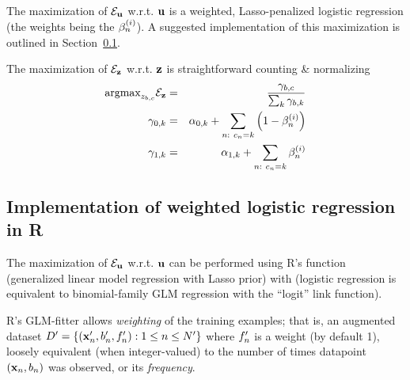 \documentclass{article}
\begin{document}
The maximization of ${\cal E}_{{\bf u}}$ w.r.t. ${\bf u}$ is a weighted, Lasso-penalized logistic regression
(the weights being the $\beta^{(i )}_{n}$).
A suggested implementation of this maximization is outlined in Section~\ref{sec:WeightedLogisticRegression}.

The maximization of ${\cal E}_{{\bf z}}$ w.r.t. ${\bf z}$ is straightforward counting \& normalizing
\begin{eqnarray*}
  \argmax_{\labelerrprob_{\binlabel,\catlabel}} \emobjective_{\labelerrprobs} & = & \frac{\labelerrsum_{\binlabel,\catlabel}}{\sum_{\catlabelindex} \labelerrsum_{\binlabel,\catlabelindex} } \\
  \labelerrsum_{0,\catlabelindex} & = & \pseudocount_{0,\catlabelindex} + \sum_{\datapoint:\ \catlabel_{\datapoint} = \catlabelindex} \left( 1 - \postprob \right) \\
  \labelerrsum_{1,\catlabelindex} & = & \pseudocount_{1,\catlabelindex} + \sum_{\datapoint:\ \catlabel_{\datapoint} = \catlabelindex} \postprob
\end{eqnarray*}

\subsection{Implementation of weighted logistic regression in R}
\label{sec:WeightedLogisticRegression}

The maximization of ${\cal E}_{{\bf u}}$ w.r.t. ${\bf u}$ can be performed using R's  function (generalized linear model regression with Lasso prior)
with 
(logistic regression is equivalent to binomial-family GLM regression with the ``logit'' link function).

R's GLM-fitter allows {\em weighting} of the training examples;
that is, an augmented dataset $D' = \{ ({\bf x}'_{n},b'_{n},f'_{n}): 1 \leq n \leq N' \}$
where $f'_{n}$ is a weight (by default 1),
loosely equivalent (when integer-valued) to the number of times datapoint $({\bf x}_{n},b_{n})$ was observed, or its {\em frequency}.
\end{document}

